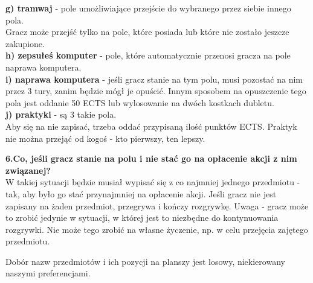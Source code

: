 \documentclass[a4paper]{article}
\begin{document}
\noindent \textbf{g) tramwaj} - pole umożliwiające przejście do wybranego przez siebie innego pola.\\
\indent Gracz może przejść tylko na pole, które posiada lub które nie zostało jeszcze zakupione. \\
\noindent \textbf{h) zepsułeś komputer} - pole, które automatycznie przenosi gracza na pole naprawa komputera.\\
\noindent \textbf{i) naprawa komputera} - jeśli gracz stanie na tym polu, musi pozostać na nim przez 3 tury, zanim będzie mógł je opuścić. Innym sposobem na opuszczenie tego pola jest oddanie 50 ECTS lub wylosowanie na dwóch kostkach dubletu.\\
\noindent \textbf{j) praktyki} - są 3 takie pola.\\
\indent Aby się na nie zapisać, trzeba oddać przypisaną ilość punktów ECTS. Praktyk nie można przejąć od kogoś - kto pierwszy, ten lepszy.\\ 
\vspace{10pt}

\noindent \textbf{6.Co, jeśli gracz stanie na polu i nie stać go na opłacenie akcji  z nim związanej?}\\
\noindent W takiej sytuacji będzie musiał wypisać się z co najmniej jednego przedmiotu - tak, aby było go stać przynajmniej na opłacenie akcji. Jeśli gracz nie jest zapisany na żaden przedmiot, przegrywa i kończy rozgrywkę. Uwaga - gracz może to zrobić jedynie w sytuacji, w której jest to niezbędne do kontynuowania rozgrywki. Nie może tego zrobić na własne życzenie, np. w celu przejęcia zajętego przedmiotu. 
\vspace{10pt}

\noindent Dobór nazw przedmiotów i ich pozycji na planszy jest losowy, niekierowany naszymi preferencjami.
\end{document}
